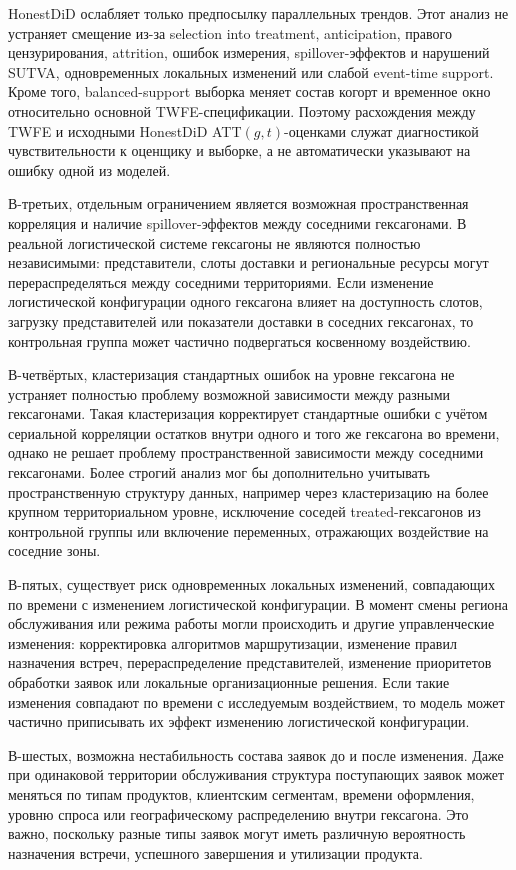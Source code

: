 \documentclass[14pt,a4paper]{extarticle}
\begin{document}
HonestDiD ослабляет только предпосылку параллельных трендов. Этот анализ не устраняет смещение из-за selection into treatment, anticipation, правого цензурирования, attrition, ошибок измерения, spillover-эффектов и нарушений SUTVA, одновременных локальных изменений или слабой event-time support. Кроме того, balanced-support выборка меняет состав когорт и временное окно относительно основной TWFE-спецификации. Поэтому расхождения между TWFE и исходными HonestDiD ATT\((g,t)\)-оценками служат диагностикой чувствительности к оценщику и выборке, а не автоматически указывают на ошибку одной из моделей.

В-третьих, отдельным ограничением является возможная пространственная корреляция и наличие spillover-эффектов между соседними гексагонами. В реальной логистической системе гексагоны не являются полностью независимыми: представители, слоты доставки и региональные ресурсы могут перераспределяться между соседними территориями. Если изменение логистической конфигурации одного гексагона влияет на доступность слотов, загрузку представителей или показатели доставки в соседних гексагонах, то контрольная группа может частично подвергаться косвенному воздействию.

В-четвёртых, кластеризация стандартных ошибок на уровне гексагона не устраняет полностью проблему возможной зависимости между разными гексагонами. Такая кластеризация корректирует стандартные ошибки с учётом сериальной корреляции остатков внутри одного и того же гексагона во времени, однако не решает проблему пространственной зависимости между соседними гексагонами. Более строгий анализ мог бы дополнительно учитывать пространственную структуру данных, например через кластеризацию на более крупном территориальном уровне, исключение соседей treated-гексагонов из контрольной группы или включение переменных, отражающих воздействие на соседние зоны.

В-пятых, существует риск одновременных локальных изменений, совпадающих по времени с изменением логистической конфигурации. В момент смены региона обслуживания или режима работы могли происходить и другие управленческие изменения: корректировка алгоритмов маршрутизации, изменение правил назначения встреч, перераспределение представителей, изменение приоритетов обработки заявок или локальные организационные решения. Если такие изменения совпадают по времени с исследуемым воздействием, то модель может частично приписывать их эффект изменению логистической конфигурации.

В-шестых, возможна нестабильность состава заявок до и после изменения. Даже при одинаковой территории обслуживания структура поступающих заявок может меняться по типам продуктов, клиентским сегментам, времени оформления, уровню спроса или географическому распределению внутри гексагона. Это важно, поскольку разные типы заявок могут иметь различную вероятность назначения встречи, успешного завершения и утилизации продукта.
\end{document}
